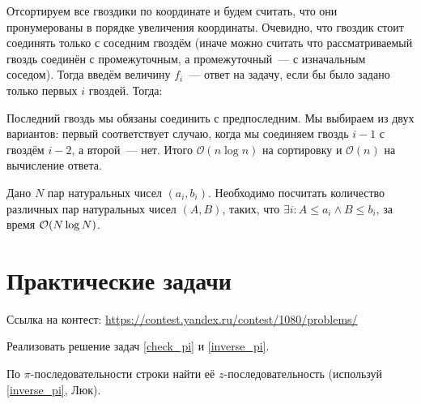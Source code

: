 \documentclass[addpoints]{exam}
\begin{document}
\begin{questions}
\begin{solution}
Отсортируем все гвоздики по координате и будем считать, что они пронумерованы в порядке увеличения координаты. Очевидно, что гвоздик стоит соединять только с соседним гвоздём (иначе можно считать что рассматриваемый гвоздь соединён с промежуточным, а промежуточный~---  с изначальным соседом). Тогда введём величину $f_i$~--- ответ на задачу, если бы было задано только первых $i$ гвоздей. Тогда:

\begin{center}
\end{center}

Последний гвоздь мы обязаны соединить с предпоследним. Мы выбираем из двух вариантов: первый соответствует случаю, когда мы соединяем гвоздь $i-1$ с гвоздём $i-2$, а второй~--- нет. Итого $\mathcal{O}(n \log{n})$ на сортировку и $\mathcal{O}(n)$ на вычисление ответа.

\end{solution}

\question[\half] Дано $N$ пар натуральных чисел $(a_i, b_i)$. Необходимо посчитать количество различных пар натуральных чисел $(A, B)$, таких, что $\exists i: A \leqslant a_i \land B \leqslant b_i$, за время $\mathcal{O}(N \log{N})$.

\section{Практические задачи}

Ссылка на контест: \url{https://contest.yandex.ru/contest/1080/problems/}

\question[1] Реализовать решение задач \ref{check_pi} и \ref{inverse_pi}.

\question[1] По $\pi$-последовательности строки найти её $z$-последовательность (используй \ref{inverse_pi}, Люк). 
 
\begin{center}
\pointtable[h][questions]
\end{center}

\end{questions}
\end{document}
